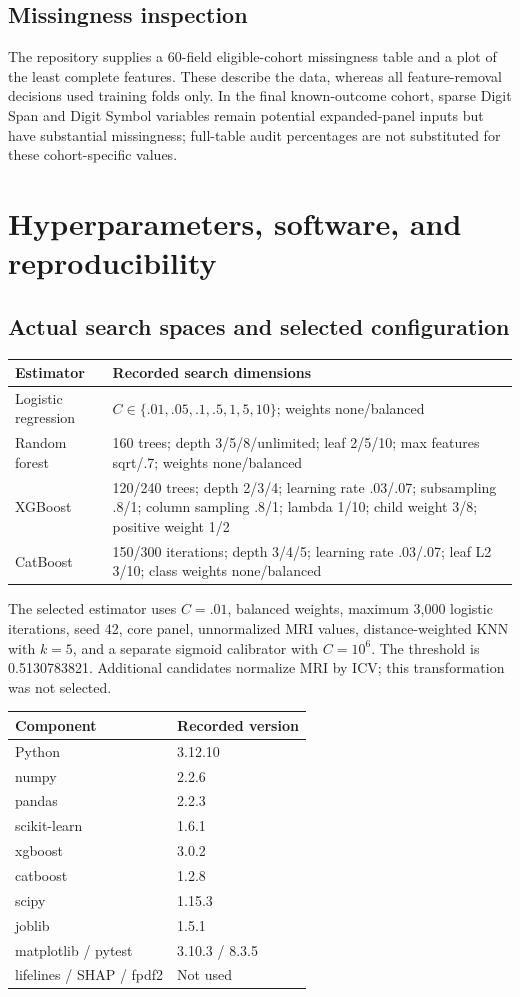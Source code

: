 \documentclass[11pt,a4paper]{article}
\begin{document}
\subsection{Missingness inspection}
The repository supplies a 60-field eligible-cohort missingness table and a plot of the least complete features. These describe the data, whereas all feature-removal decisions used training folds only. In the final known-outcome cohort, sparse Digit Span and Digit Symbol variables remain potential expanded-panel inputs but have substantial missingness; full-table audit percentages are not substituted for these cohort-specific values.

\clearpage
\section{Hyperparameters, software, and reproducibility}
\subsection{Actual search spaces and selected configuration}
\begin{center}\small
\begin{tabular}{p{.23\linewidth}p{.68\linewidth}}\hline
Estimator & Recorded search dimensions\\\hline
Logistic regression & $C\in\{.01,.05,.1,.5,1,5,10\}$; weights none/balanced\\
Random forest & 160 trees; depth 3/5/8/unlimited; leaf 2/5/10; max features sqrt/.7; weights none/balanced\\
XGBoost & 120/240 trees; depth 2/3/4; learning rate .03/.07; subsampling .8/1; column sampling .8/1; lambda 1/10; child weight 3/8; positive weight 1/2\\
CatBoost & 150/300 iterations; depth 3/4/5; learning rate .03/.07; leaf L2 3/10; class weights none/balanced\\
\hline\end{tabular}\end{center}
The selected estimator uses $C=.01$, balanced weights, maximum 3,000 logistic iterations, seed 42, core panel, unnormalized MRI values, distance-weighted KNN with $k=5$, and a separate sigmoid calibrator with $C=10^6$. The threshold is 0.5130783821. Additional candidates normalize MRI by ICV; this transformation was not selected.
\begin{center}\small
\begin{tabular}{p{.50\linewidth}l}\hline
Component & Recorded version\\\hline
Python & 3.12.10\\
numpy & 2.2.6\\
pandas & 2.2.3\\
scikit-learn & 1.6.1\\
xgboost & 3.0.2\\
catboost & 1.2.8\\
scipy & 1.15.3\\
joblib & 1.5.1\\
matplotlib / pytest & 3.10.3 / 8.3.5\\
lifelines / SHAP / fpdf2 & Not used\\
\hline\end{tabular}\end{center}
\end{document}
